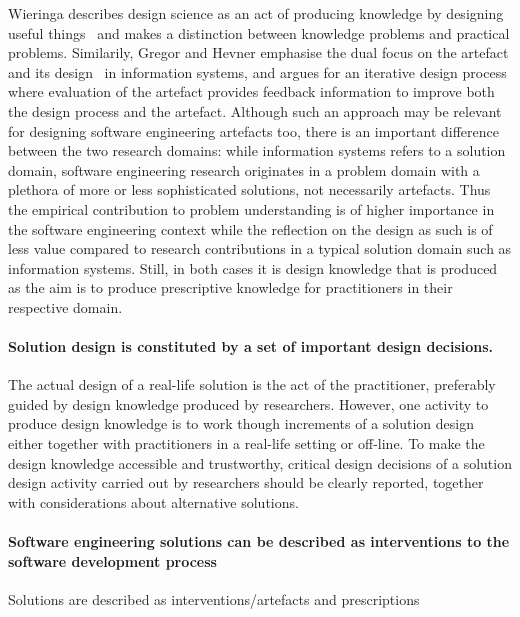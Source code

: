 \documentclass[graybox]{svmult}
\begin{document}
Wieringa describes design science as an act of producing knowledge by designing useful things~\cite{wieringa_design_2009} and makes a distinction between knowledge problems and practical problems. Similarily, Gregor and Hevner emphasise the dual focus on the artefact and its design~\cite{gregor_positioning_2013} in information systems, and argues for an iterative design process where evaluation of the artefact provides feedback information to improve both the design process and the artefact. Although such an approach may be relevant for designing software engineering artefacts too, there is an important difference between the two research domains: while information systems refers to a solution domain, software engineering research originates in a problem domain with a plethora of more or less sophisticated solutions, not necessarily artefacts. Thus the empirical contribution to problem understanding is of higher importance in the software engineering context while the reflection on the design as such is of less value compared to research contributions in a typical solution domain such as information systems. Still, in both cases it is design knowledge that is produced as the aim is to produce prescriptive knowledge for practitioners in their respective domain. 

\paragraph{Solution design is constituted by a set of important design decisions.}  The actual design of a real-life solution is the act of the practitioner, preferably guided by design knowledge produced by researchers. However, one activity to produce design knowledge is to work though increments of a solution design either together with practitioners in a real-life setting or off-line. To make the design knowledge accessible and trustworthy, critical design decisions of a solution design activity carried out by researchers should be clearly reported, together with considerations about alternative solutions. 

\paragraph{Software engineering solutions can be described as interventions to the software development process}
Solutions are described as interventions/artefacts and prescriptions
\end{document}
